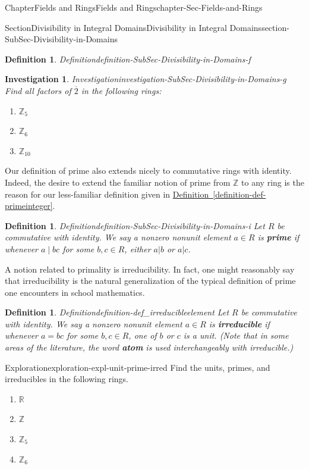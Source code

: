 \documentclass[oneside,10pt,]{book}
\newcommand{\xreffont}{\relax}
\newcommand{\terminology}[1]{\textbf{#1}}
\numberwithin{equation}{section}
\def\Z{{\mathbb Z}}
\def\R{{\mathbb R}}
\newtheorem{definition}[theorem]{Definition}
\newtheorem{investigation}[theorem]{Investigation}
\begin{document}
\begin{chapterptx}{Chapter}{Fields and Rings}{}{Fields and Rings}{}{}{chapter-Sec-Fields-and-Rings}
\begin{sectionptx}{Section}{Divisibility in Integral Domains}{}{Divisibility in Integral Domains}{}{}{section-SubSec-Divisibility-in-Domains}
\begin{definition}{Definition}{}{definition-SubSec-Divisibility-in-Domains-f}
\end{definition}
\begin{investigation}{Investigation}{}{investigation-SubSec-Divisibility-in-Domains-g}%
Find all factors of \(\overline{2}\) in the following rings:%
%
\begin{enumerate}
\item{}\(\displaystyle \Z_5\)%
\item{}\(\displaystyle \Z_6\)%
\item{}\(\displaystyle \Z_{10}\)%
\end{enumerate}
\end{investigation}%
Our definition of prime also extends nicely to commutative rings with identity. Indeed, the desire to extend the familiar notion of prime from \(\Z\) to any ring is the reason for our less-familiar definition given in \hyperref[definition-def-primeinteger]{Definition~{\xreffont\ref{definition-def-primeinteger}}}.%
\begin{definition}{Definition}{}{definition-SubSec-Divisibility-in-Domains-i}%
Let \(R\) be commutative with identity. We say a nonzero nonunit element \(a\in R\) is \terminology{prime} if whenever \(a\mid bc\) for some \(b,c\in R\), either \(a|b\) or \(a|c\).%
\end{definition}
A notion related to primality is irreducibility. In fact, one might reasonably say that irreducibility is the natural generalization of the typical definition of prime one encounters in school mathematics.%
\begin{definition}{Definition}{}{definition-def_irreducibleelement}%
%
%
Let \(R\) be commutative with identity. We say a nonzero nonunit element \(a\in R\) is \terminology{irreducible} if whenever \(a = bc\) for some \(b,c\in R\), one of \(b\) or \(c\) is a unit. (Note that in some areas of the literature, the word \terminology{atom} is used interchangeably with irreducible.)%
\end{definition}
\begin{exploration}{Exploration}{}{exploration-expl-unit-prime-irred}%
Find the units, primes, and irreducibles in the following rings.%
%
\begin{enumerate}
\item{}\(\displaystyle \R\)%
\item{}\(\displaystyle \Z\)%
\item{}\(\displaystyle \Z_{5}\)%
\item{}\(\displaystyle \Z_6\)%
\end{enumerate}

\end{exploration}
\end{sectionptx}
\end{chapterptx}
\end{document}
